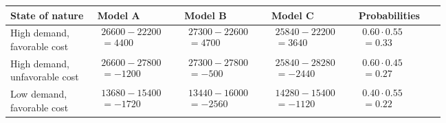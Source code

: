 \begin{ExamProblems}
\begin{center}
\begin{tabular}{p{0.19\linewidth} p{0.19\linewidth} p{0.19\linewidth} p{0.19\linewidth} p{0.19\linewidth}}
			\toprule
			State of nature & Model A & Model B & Model C & Probabilities \\
			\midrule
			\parbox[t]{\linewidth}{High demand,\\ favorable cost} &
			$\begin{array}{l}
				26600 - 22200\\
				= 4400
			\end{array}$ &
			$\begin{array}{l}
				27300 - 22600\\
				= 4700
			\end{array}$ &
			$\begin{array}{l}
				25840 - 22200\\
				= 3640
			\end{array}$ &
			$\begin{array}{l}
				0.60\cdot 0.55\\
				= 0.33
			\end{array}$ \\
			
			\parbox[t]{\linewidth}{High demand,\\ unfavorable cost} &
			$\begin{array}{l}
				26600 - 27800\\
				= -1200
			\end{array}$ &
			$\begin{array}{l}
				27300 - 27800\\
				= -500
			\end{array}$ &
			$\begin{array}{l}
				25840 - 28280\\
				= -2440
			\end{array}$ &
			$\begin{array}{l}
				0.60\cdot 0.45\\
				= 0.27
			\end{array}$ \\
			
			\parbox[t]{\linewidth}{Low demand,\\ favorable cost} &
			$\begin{array}{l}
				13680 - 15400\\
				= -1720
			\end{array}$ &
			$\begin{array}{l}
				13440 - 16000\\
				= -2560
			\end{array}$ &
			$\begin{array}{l}
				14280 - 15400\\
				= -1120
			\end{array}$ &
			$\begin{array}{l}
				0.40\cdot 0.55\\
				= 0.22
			\end{array}$ \\
			

\end{tabular}
\end{center}
\end{ExamProblems}
